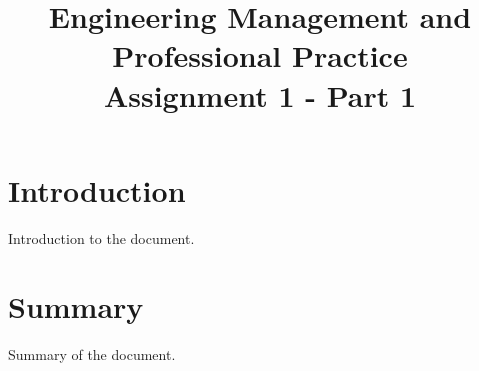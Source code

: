 \documentclass[conference]{IEEEtran}
\begin{document}
\title{Engineering Management and Professional Practice\\
Assignment 1 - Part 1
}

\author{
}


\maketitle



\section{Introduction}
Introduction to the document.

\section{Summary}
Summary of the document.

% 
% 
\end{document}
